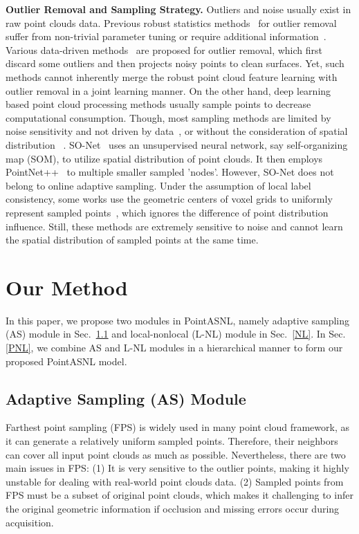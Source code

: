 \documentclass[10pt,twocolumn,letterpaper]{article}
\begin{document}
	
	{\noindent\bf Outlier Removal and Sampling Strategy.} Outliers and noise usually exist in raw point clouds data. Previous robust statistics methods~\cite{aggarwal2015outlier} for outlier removal suffer from non-trivial parameter tuning or require additional information~\cite{wolff2016point}. Various data-driven methods~\cite{guerrero2018pcpnet,rakotosaona2019pointcleannet} are proposed for outlier removal, which first discard some outliers and then projects noisy points to clean surfaces. Yet, such methods cannot inherently merge the robust point cloud feature learning with outlier removal in a joint learning manner. On the other hand, deep learning based point cloud processing methods usually sample points to decrease computational consumption. Though, most sampling methods are limited by noise sensitivity and not driven by data~\cite{pointnet2,Monte}, or without the consideration of spatial distribution ~\cite{Gumbel}. SO-Net~\cite{So-net} uses an unsupervised neural network, say self-organizing map (SOM), to utilize spatial distribution of point clouds. It then employs PointNet++~\cite{pointnet2} to multiple smaller sampled 'nodes'. However, SO-Net does not belong to online adaptive sampling. Under the assumption of local label consistency, some works use the geometric centers of voxel grids to uniformly represent sampled points~\cite{KPCONV,ecc}, which ignores the difference of point distribution influence. Still, these methods are extremely sensitive to noise and cannot learn the spatial distribution of sampled points at the same time.
	







	\section{Our Method}
	In this paper, we propose two modules in PointASNL, namely adaptive sampling (AS) module in Sec.~\ref{AS} and local-nonlocal (L-NL) module in Sec.~\ref{NL}. In Sec.\ref{PNL}, we combine AS and L-NL modules in a hierarchical manner to form our proposed PointASNL model.
	
	
	\subsection{Adaptive Sampling (AS) Module}
	\label{AS}
	Farthest point sampling (FPS) is widely used in many point cloud framework, as it can generate a relatively uniform sampled points. Therefore, their neighbors can cover all input point clouds as much as possible. Nevertheless, there are two main issues in FPS: (1) It is very sensitive to the outlier points, making it highly unstable for dealing with real-world point clouds data. (2) Sampled points from FPS must be a subset of original point clouds, which makes it challenging to infer the original geometric information if occlusion and missing errors occur during acquisition.
\end{document}
